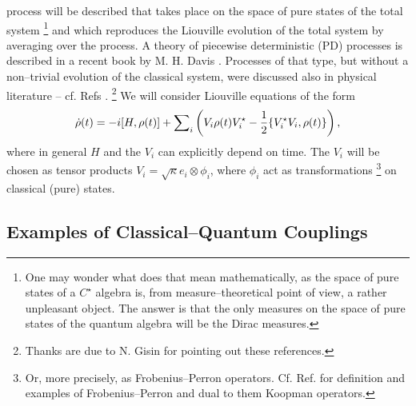 \documentclass[12pt]{article}
\def\be{\begin{equation}} \def\ee{\end{equation}}
\begin{document}
process  will be described that takes place on the space of pure
states of the total system
\footnote{One may wonder what does that mean mathematically, as
the space of pure states of a $C^{\star}$ algebra is, from
measure--theoretical point of view, a rather
unpleasant object. The answer is that the only measures on the
space of pure states of the quantum algebra will be the Dirac
measures.}
 and which reproduces the Liouville
evolution of the total system by averaging over the process.
A theory of piecewise
deterministic  (PD) processes is described in a recent book by M. H. 
Davis \cite{dav}.  Processes of that type,  but without a non--trivial
evolution of the classical system,  were discussed also in physical
literature -- cf.  Refs \cite{car,dal,dum,gar}.
\footnote{Thanks are due to N.  Gisin for pointing out these
references. }
We will consider Liouville equations of the form
\be {\dot \rho} (t) = -i[H , \rho  (t)] + {\sum}_{i} \left  ( V_i
\rho  (t) V_i^{\star} - {1 \over 2}
\{V_i^{\star} V_i ,  \rho  (t)\}
\right ) ,  \label{eq: lio}\ee  where in  general $H$ and the $V_i$ can
explicitly depend on time. 
The $V_i$ will be chosen as tensor products
$V_i=\sqrt{\kappa} e_i\otimes\phi_i$,  where
$\phi_i$ act as transformations
\footnote{Or, more precisely, as Frobenius--Perron operators. Cf.
Ref.\cite{las} for definition and examples of Frobenius--Perron and
dual to them Koopman operators.} 
 on classical  (pure) states. 
\subsection{Examples of Classical--Quantum Couplings}
\end{document}
